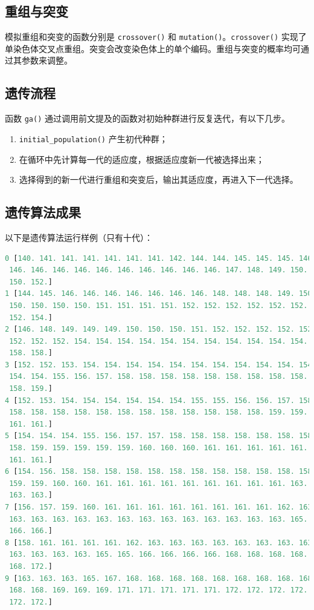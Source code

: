 \documentclass{cumcmthesis}
\begin{document}
	\subsection{重组与突变}

	模拟重组和突变的函数分别是 \texttt{crossover()} 和 \texttt{mutation()}。\texttt{crossover()} 实现了单染色体交叉点重组。突变会改变染色体上的单个编码。重组与突变的概率均可通过其参数来调整。

	\subsection{遗传流程}

	函数 \texttt{ga()} 通过调用前文提及的函数对初始种群进行反复迭代，有以下几步。
	\begin{enumerate}
		\item \texttt{initial\_population()} 产生初代种群；
		\item 在循环中先计算每一代的适应度，根据适应度新一代被选择出来；
		\item 选择得到的新一代进行重组和突变后，输出其适应度，再进入下一代选择。
	\end{enumerate}

	\subsection{遗传算法成果}

	以下是遗传算法运行样例（只有十代）：
	
	\begin{lstlisting}[language=python]
0 [140. 141. 141. 141. 141. 141. 141. 142. 144. 144. 145. 145. 145. 146.
 146. 146. 146. 146. 146. 146. 146. 146. 146. 146. 147. 148. 149. 150.
 150. 152.]
1 [144. 145. 146. 146. 146. 146. 146. 146. 146. 148. 148. 148. 149. 150.
 150. 150. 150. 150. 151. 151. 151. 151. 152. 152. 152. 152. 152. 152.
 152. 154.]
2 [146. 148. 149. 149. 149. 150. 150. 150. 151. 152. 152. 152. 152. 152.
 152. 152. 152. 154. 154. 154. 154. 154. 154. 154. 154. 154. 154. 154.
 158. 158.]
3 [152. 152. 153. 154. 154. 154. 154. 154. 154. 154. 154. 154. 154. 154.
 154. 154. 155. 156. 157. 158. 158. 158. 158. 158. 158. 158. 158. 158.
 158. 159.]
4 [152. 153. 154. 154. 154. 154. 154. 154. 155. 155. 156. 156. 157. 158.
 158. 158. 158. 158. 158. 158. 158. 158. 158. 158. 158. 158. 159. 159.
 161. 161.]
5 [154. 154. 154. 155. 156. 157. 157. 158. 158. 158. 158. 158. 158. 158.
 158. 159. 159. 159. 159. 159. 160. 160. 160. 161. 161. 161. 161. 161.
 161. 161.]
6 [154. 156. 158. 158. 158. 158. 158. 158. 158. 158. 158. 158. 158. 158.
 159. 159. 160. 160. 161. 161. 161. 161. 161. 161. 161. 161. 161. 163.
 163. 163.]
7 [156. 157. 159. 160. 161. 161. 161. 161. 161. 161. 161. 161. 162. 163.
 163. 163. 163. 163. 163. 163. 163. 163. 163. 163. 163. 163. 163. 165.
 166. 166.]
8 [158. 161. 161. 161. 161. 162. 163. 163. 163. 163. 163. 163. 163. 163.
 163. 163. 163. 163. 165. 165. 166. 166. 166. 166. 168. 168. 168. 168.
 168. 172.]
9 [163. 163. 163. 165. 167. 168. 168. 168. 168. 168. 168. 168. 168. 168.
 168. 168. 169. 169. 169. 171. 171. 171. 171. 171. 172. 172. 172. 172.
 172. 172.]
	\end{lstlisting}
\end{document}

